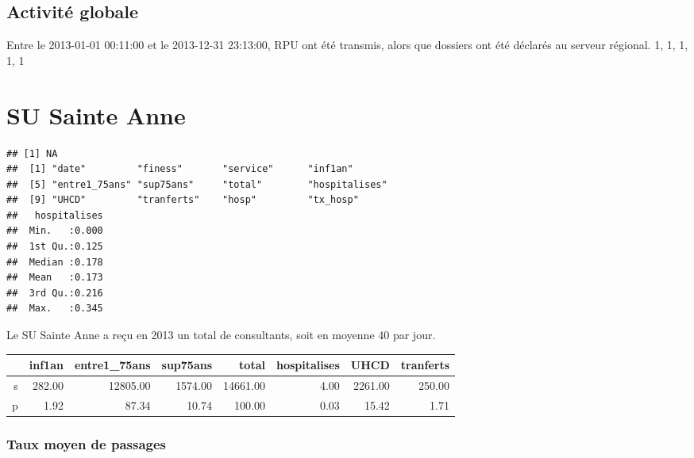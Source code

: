 \documentclass[12pt,english,french,twoside]{report}\usepackage[]{graphicx}\usepackage[]{color}
\makeatletter
\newenvironment{kframe}{%
 \def\at@end@of@kframe{}%
 \ifinner\ifhmode%
  \def\at@end@of@kframe{\end{minipage}}%
  \begin{minipage}{\columnwidth}%
 \fi\fi%
 \def\FrameCommand##1{\hskip\@totalleftmargin \hskip-\fboxsep
 \colorbox{shadecolor}{##1}\hskip-\fboxsep
     \hskip-\linewidth \hskip-\@totalleftmargin \hskip\columnwidth}%
 \MakeFramed {\advance\hsize-\width
   \@totalleftmargin\z@ \linewidth\hsize
   \@setminipage}}%
 {\par\unskip\endMakeFramed%
 \at@end@of@kframe}
\newenvironment{knitrout}{}{} %
\makeatother
\begin{document}
\section{Activité globale}




Entre le 2013-01-01 00:11:00 et le 2013-12-31 23:13:00,  RPU ont été transmis, alors que  dossiers ont été déclarés au serveur régional. 
1, 1, 1, 1, 1



\chapter{SU Sainte Anne}


\begin{knitrout}
\color{fgcolor}\begin{kframe}
\begin{verbatim}
## [1] NA
##  [1] "date"         "finess"       "service"      "inf1an"      
##  [5] "entre1_75ans" "sup75ans"     "total"        "hospitalises"
##  [9] "UHCD"         "tranferts"    "hosp"         "tx_hosp"
##   hospitalises  
##  Min.   :0.000  
##  1st Qu.:0.125  
##  Median :0.178  
##  Mean   :0.173  
##  3rd Qu.:0.216  
##  Max.   :0.345
\end{verbatim}
\end{kframe}
\end{knitrout}


Le SU Sainte Anne a reçu en 2013 un total de  consultants, soit en moyenne 40 par jour.

\begin{table}[ht]
\centering
\begin{tabular}{rrrrrrrr}
  \hline
 & inf1an & entre1\_75ans & sup75ans & total & hospitalises & UHCD & tranferts \\ 
  \hline
s & 282.00 & 12805.00 & 1574.00 & 14661.00 & 4.00 & 2261.00 & 250.00 \\ 
  p & 1.92 & 87.34 & 10.74 & 100.00 & 0.03 & 15.42 & 1.71 \\ 
   \hline
\end{tabular}
\end{table}



\subsection{Taux moyen de passages}
\end{document}
